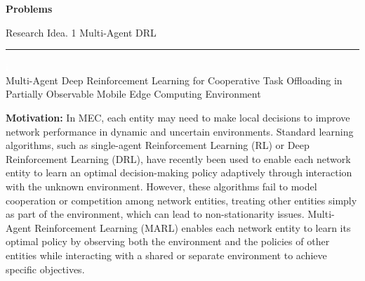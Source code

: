 \documentclass[12pt]{article}
\begin{document}
\noindent\large\textbf{Problems}

\newpage






\begin{center} 
	
	
	\vspace{-17mm}

	\large Research Idea. 1  \hfill Multi-Agent DRL \vspace{1mm} \hrule
	
	\vspace{-1mm}
	
	\textcolor{white}{i} \\ \LARGE Multi-Agent Deep Reinforcement Learning for Cooperative Task Offloading in Partially Observable Mobile Edge Computing Environment \vspace{6mm}\\ 

\end{center} \small
\vspace{-5mm}

\noindent\textbf{\large Motivation:  }
\noindent
In MEC, each entity may need to make local decisions to improve network performance in dynamic and uncertain environments. Standard learning algorithms, such as single-agent Reinforcement Learning (RL) or Deep Reinforcement Learning (DRL), have recently been used to enable each network entity to learn an optimal decision-making policy adaptively through interaction with the unknown environment. However, these algorithms fail to model cooperation or competition among network entities, treating other entities simply as part of the environment, which can lead to non-stationarity issues. Multi-Agent Reinforcement Learning (MARL) enables each network entity to learn its optimal policy by observing both the environment and the policies of other entities while interacting with a shared or separate environment to achieve specific objectives.
 


\end{document}
